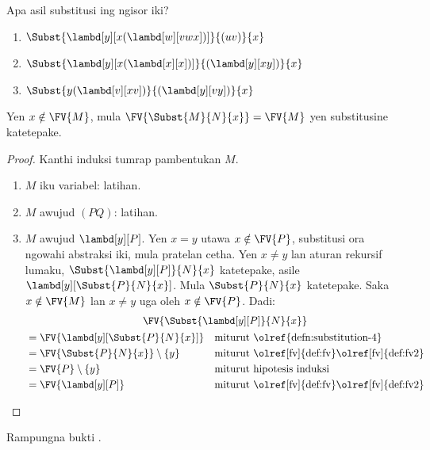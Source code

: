 \documentclass[../../../include/open-logic-section]{subfiles}
\begin{document}
\begin{prob}
  Apa asil substitusi ing ngisor iki?
  \begin{enumerate}
  \item $\Subst{\lambd[y][x(\lambd[w][vwx])]}{(uv)}{x}$
  \item $\Subst{\lambd[y][x(\lambd[x][x])]}{(\lambd[y][xy])}{x}$
  \item $\Subst{y(\lambd[v][xv])}{(\lambd[y][vy])}{x}$
  \end{enumerate}
\end{prob}

\begin{thm} 
  Yen $x \notin \FV{M}$, mula
  $\FV{\Subst{M}{N}{x}} = \FV{M}$
  yen substitusine katetepake.
\end{thm}

\begin{proof}
  Kanthi induksi tumrap pambentukan $M$.
  \begin{enumerate}
  \item $M$ iku variabel: latihan.
  \item $M$ awujud $(PQ)$: latihan.
  \item $M$ awujud $\lambd[y][P]$.
    Yen $x=y$ utawa
    $x \notin \FV{P}$, substitusi
    ora ngowahi abstraksi iki,
    mula pratelan cetha.
    Yen $x \neq y$ lan
    aturan rekursif lumaku,
    $\Subst{\lambd[y][P]}{N}{x}$
    katetepake, asile
    $\lambd[y][\Subst{P}{N}{x}]$.
    Mula $\Subst{P}{N}{x}$
    katetepake. Saka
    $x \notin \FV{M}$ lan $x \neq y$
    uga oleh $x \notin \FV{P}$.
    Dadi:
    \begin{multline*}
      \FV{\Subst{\lambd[y][P]}{N}{x}} \\
    \begin{aligned}
      & = \FV{\lambd[y][\Subst{P}{N}{x}]} &&
      \text{miturut \olref{defn:substitution-4}}\\
      & = \FV{\Subst{P}{N}{x}} \setminus \{y\} &&
      \text{miturut \olref[fv]{def:fv}\olref[fv]{def:fv2}}\\
      & = \FV{P} \setminus \{y\} && \text{miturut hipotesis induksi} \\
      & = \FV{\lambd[y][P]} && \text{miturut \olref[fv]{def:fv}\olref[fv]{def:fv2}}
    \end{aligned}
    \end{multline*}
  \end{enumerate}
\end{proof}

\begin{prob}
  Rampungna bukti .
\end{prob}
\end{document}
